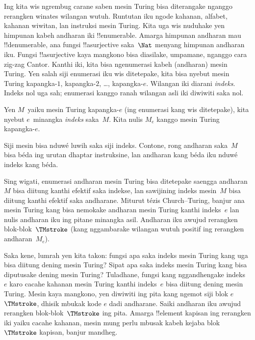 \documentclass[../../../include/open-logic-section]{subfiles}
\begin{document}

Ing  kita wis ngrembug carane
saben mesin Turing bisa diterangake nganggo rerangken
winates wilangan wutuh. Runtutan iku ngode kahanan,
alfabet, kahanan wiwitan, lan instruksi mesin Turing.
Kita uga wis nuduhake yen himpunan kabeh andharan
iki !!{enumerable}. Amarga himpunan andharan mau
!!{denumerable}, ana fungsi !!a{surjective}
saka~$\Nat$ menyang himpunan andharan iku. Fungsi
!!a{surjective} kaya mangkono bisa diasilake,
umpamane, nganggo cara zig-zag Cantor. Kanthi iki,
kita bisa ngenumerasi kabeh (andharan) mesin Turing.
Yen salah siji enumerasi iku wis ditetepake,
kita bisa nyebut mesin Turing kapangka-$1$,
kapangka-$2$, \dots, kapangka-$e$. Wilangan
iki diarani \emph{indeks}. Indeks nol uga sah; enumerasi kanggo ranah wilangan asli iki diwiwiti saka nol.

\begin{defn}
Yen $M$~yaiku mesin Turing kapangka-$e$
(ing enumerasi kang wis ditetepake), kita nyebut
$e$~minangka \emph{indeks} saka~$M$. Kita nulis
$M_e$ kanggo mesin Turing kapangka-$e$.
\end{defn}

Siji mesin bisa nduwé luwih saka siji indeks.
Contone, rong andharan saka~$M$ bisa béda
ing urutan dhaptar instruksine, lan andharan
kang béda iku nduwé indeks kang béda.

Sing wigati, enumerasi andharan mesin Turing bisa
ditetepake saengga andharan~$M$ bisa diitung
kanthi efektif saka indekse, lan sawijining indeks
mesin~$M$ bisa diitung kanthi efektif saka
andharane. Miturut tézis Church--Turing, banjur
ana mesin Turing kang bisa nemokake andharan
mesin Turing kanthi indeks~$e$ lan nulis andharan
iku ing pitane minangka asil. Andharan iku
awujud rerangken blok-blok~$\TMstroke$ (kang
nggambarake wilangan wutuh positif ing rerangken
andharan~$M_e$).

Saka kene, lumrah yen kita takon: fungsi apa
saka indeks mesin Turing kang uga bisa diitung
dening mesin Turing? Sipat apa saka indeks mesin
Turing kang bisa diputusake dening mesin Turing?
Tuladhane, fungsi kang nggandhengake indeks~$e$
karo cacahe kahanan mesin Turing kanthi indeks~$e$
bisa diitung dening mesin Turing. Mesin kaya
mangkono, yen diwiwiti ing pita kang ngemot
siji blok $e$~$\TMstroke$, dhisik mbukak kode
$e$ dadi andharane. Saiki andharan iku awujud
rerangken blok-blok~$\TMstroke$ ing pita. Amarga
!!{element} kapisan ing rerangken iki yaiku
cacahe kahanan, mesin mung perlu mbusak kabeh
kejaba blok $\TMstroke$ kapisan, banjur mandheg.
\end{document}
